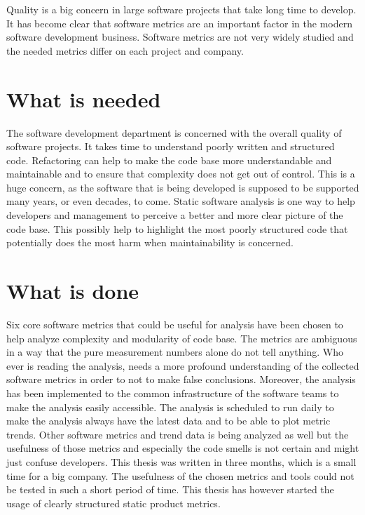 Quality is a big concern in large software projects that take long time to develop.
It has become clear that software metrics are an important factor in the modern software development business. Software metrics are not very widely studied and the needed metrics differ on each project and company. 

\section{What is needed}

The software development department is concerned with the overall quality of software projects. It takes time to understand poorly written and structured code. Refactoring can help to make the code base more understandable and maintainable and to ensure that complexity does not get out of control. This is a huge concern, as the software that is being developed is supposed to be supported many years, or even decades, to come. Static software analysis is one way to help developers and management to perceive a better and more clear picture of the code base. This possibly help to highlight the most poorly structured code that potentially does the most harm when maintainability is concerned.

\section{What is done}

Six core software metrics that could be useful for analysis have been chosen to help analyze complexity and modularity of code base. The metrics are ambiguous in a way that the pure measurement numbers alone do not tell anything. Who ever is reading the analysis, needs a more profound understanding of the collected software metrics in order to not to make false conclusions. Moreover, the analysis has been implemented to the common infrastructure of the software teams to make the analysis easily accessible. The analysis is scheduled to run daily to make the analysis always have the latest data and to be able to plot metric trends. Other software metrics and trend data is being analyzed as well but the usefulness of those metrics and especially the code smells is not certain and might just confuse developers. This thesis was written in three months, which is a small time for a big company. The usefulness of the chosen metrics and tools could not be tested in such a short period of time. This thesis has however started the usage of clearly structured static product metrics.


